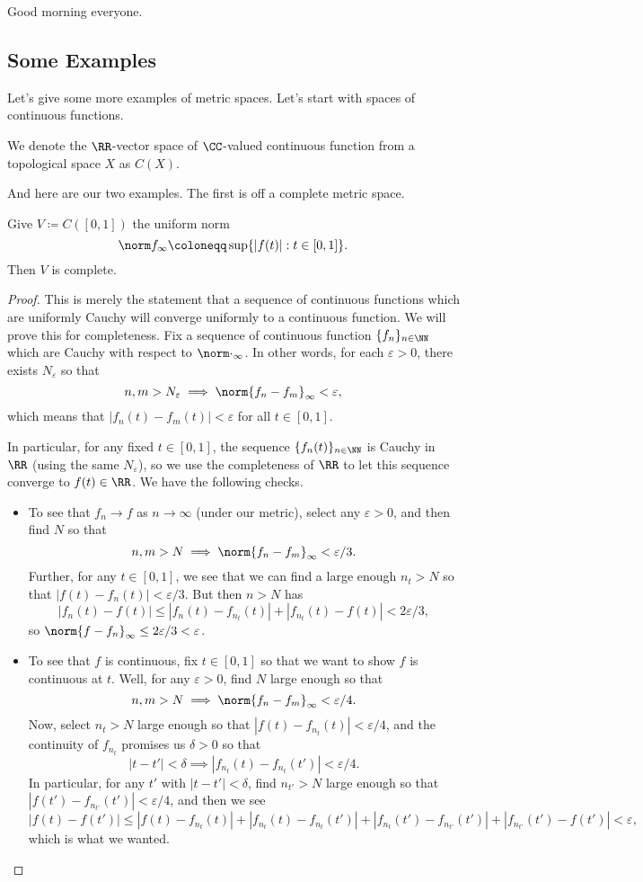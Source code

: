 \documentclass[../notes.tex]{subfiles}
\begin{document}
Good morning everyone.

\subsection{Some Examples}
Let's give some more examples of metric spaces. Let's start with spaces of continuous functions.
\begin{definition}
	We denote the $\RR$-vector space of $\CC$-valued continuous function from a topological space $X$ as $C(X)$.
\end{definition}
And here are our two examples. The first is off a complete metric space.
\begin{exe}
	Give $V\coloneqq C([0,1])$ the uniform norm
	\[\norm f_\infty\coloneqq\sup\{|f(t)|:t\in[0,1]\}.\]
	Then $V$ is complete.
\end{exe}
\begin{proof}
	This is merely the statement that a sequence of continuous functions which are uniformly Cauchy will converge uniformly to a continuous function. We will prove this for completeness. Fix a sequence of continuous function $\{f_n\}_{n\in\NN}$ which are Cauchy with respect to $\norm\cdot_\infty$. In other words, for each $\varepsilon>0$, there exists $N_\varepsilon$ so that
	\[n,m>N_\varepsilon\implies\norm{f_n-f_m}_\infty<\varepsilon,\]
	which means that $|f_n(t)-f_m(t)|<\varepsilon$ for all $t\in[0,1]$.

	In particular, for any fixed $t\in[0,1]$, the sequence $\{f_n(t)\}_{n\in\NN}$ is Cauchy in $\RR$ (using the same $N_\varepsilon$), so we use the completeness of $\RR$ to let this sequence converge to $f(t)\in\RR$. We have the following checks.
	\begin{itemize}
		\item To see that $f_n\to f$ as $n\to\infty$ (under our metric), select any $\varepsilon>0$, and then find $N$ so that
		\[n,m>N\implies\norm{f_n-f_m}_\infty<\varepsilon/3.\]
		Further, for any $t\in[0,1]$, we see that we can find a large enough $n_t>N$ so that $|f(t)-f_n(t)|<\varepsilon/3$. But then $n>N$ has
		\[|f_n(t)-f(t)|\le|f_n(t)-f_{n_t}(t)|+|f_{n_t}(t)-f(t)|<2\varepsilon/3,\]
		so $\norm{f-f_n}_\infty\le2\varepsilon/3<\varepsilon$.
		\item To see that $f$ is continuous, fix $t\in[0,1]$ so that we want to show $f$ is continuous at $t$. Well, for any $\varepsilon>0$, find $N$ large enough so that
		\[n,m>N\implies\norm{f_n-f_m}_\infty<\varepsilon/4.\]
		Now, select $n_t>N$ large enough so that $|f(t)-f_{n_t}(t)|<\varepsilon/4$, and the continuity of $f_{n_t}$ promises us $\delta>0$ so that
		\[|t-t'|<\delta\implies|f_{n_t}(t)-f_{n_t}(t')|<\varepsilon/4.\]
		In particular, for any $t'$ with $|t-t'|<\delta$, find $n_{t'}>N$ large enough so that $|f(t')-f_{n_{t'}}(t')|<\varepsilon/4$, and then we see
		\[|f(t)-f(t')|\le|f(t)-f_{n_t}(t)|+|f_{n_t}(t)-f_{n_{t}}(t')|+|f_{n_t}(t')-f_{n_{t'}}(t')|+|f_{n_{t'}}(t')-f(t')|<\varepsilon,\]
		which is what we wanted.
		\qedhere
	\end{itemize}
\end{proof}
\end{document}
